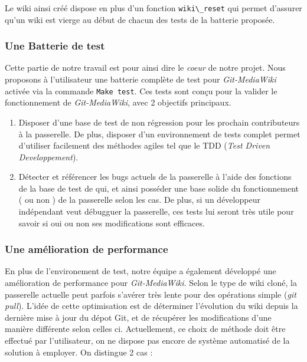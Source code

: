 \documentclass[11pt]{article}
\begin{document}
Le wiki ainsi créé dispose en plus d'un fonction 
\lstinline!wiki\_reset! qui permet d'assurer qu'un wiki est vierge
au début de chacun des tests de la batterie proposée.

\subsubsection{Une Batterie de test}

Cette partie de notre travail est pour ainsi dire le \textit{coeur} 
de notre projet. Nous proposons à l'utilisateur une batterie complète
de test pour \textit{Git-MediaWiki} activée via la commande 
\lstinline!Make test!. Ces tests sont conçu pour la valider le 
fonctionnement de \textit{Git-MediaWiki}, avec 2 objectifs principaux.

\begin{enumerate}
\item Disposer d'une base de test de non régression pour les prochain 
contributeurs à la passerelle. De plus, disposer d'un environnement de 
tests complet permet d'utiliser facilement des méthodes agiles tel que
le TDD (\textit{Test Driven Developpement}). \\
\item Détecter et référencer les bugs actuels de la passerelle à l'aide
des fonctions de la base de test de qui, et ainsi posséder une base 
solide du fonctionnement ( ou non ) de la passerelle selon les cas. De
plus, si un développeur indépendant veut débugguer la passerelle, ces 
tests lui seront très utile pour savoir si oui ou non ses modifications
sont efficaces.
\end{enumerate}

\subsubsection{Une amélioration de performance}

En plus de l'environement de test, notre équipe a également développé 
une amélioration de performance pour \textit{Git-MediaWiki}. Selon le
type de wiki cloné, la passerelle actuelle peut parfois s'avérer très
lente pour des opérations simple (\textit{git pull}). L'idée de cette
optimisation est de déterminer l'évolution du wiki depuis la dernière
mise à jour du dépot Git, et de récupérer les modifications d'une 
manière différente selon celles ci. Actuellement, ce choix de méthode
doit être effectué par l'utilisateur, on ne dispose pas encore de
système automatisé de la solution à employer.  On distingue 2 cas :
\end{document}
